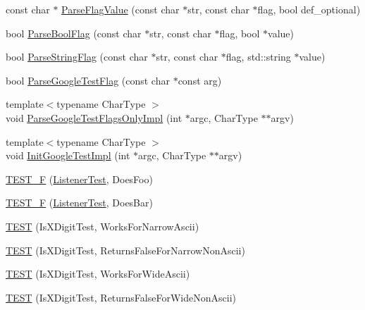 \begin{DoxyCompactItemize}
\item 
const char $\ast$ \hyperlink{namespacetesting_1_1internal_a8bfd56af5e4a89bfb76f7e1723e41b03}{Parse\+Flag\+Value} (const char $\ast$str, const char $\ast$flag, bool def\+\_\+optional)
\item 
bool \hyperlink{namespacetesting_1_1internal_ada3b98e7cfe93f4ba2053c470d9e3e51}{Parse\+Bool\+Flag} (const char $\ast$str, const char $\ast$flag, bool $\ast$value)
\item 
bool \hyperlink{namespacetesting_1_1internal_aa4ce312efaaf7a97aac2303173afe021}{Parse\+String\+Flag} (const char $\ast$str, const char $\ast$flag, std\+::string $\ast$value)
\item 
bool \hyperlink{namespacetesting_1_1internal_afccff08aa2b1ede0dd32c1364a5dee42}{Parse\+Google\+Test\+Flag} (const char $\ast$const arg)
\item 
{\footnotesize template$<$typename Char\+Type $>$ }\\void \hyperlink{namespacetesting_1_1internal_ae4c46ce8c3d016848fff52cc5133f2ac}{Parse\+Google\+Test\+Flags\+Only\+Impl} (int $\ast$argc, Char\+Type $\ast$$\ast$argv)
\item 
{\footnotesize template$<$typename Char\+Type $>$ }\\void \hyperlink{namespacetesting_1_1internal_ac3c6fa93391768aa91c6238b31aaeeb5}{Init\+Google\+Test\+Impl} (int $\ast$argc, Char\+Type $\ast$$\ast$argv)
\item 
\hyperlink{namespacetesting_1_1internal_a7e113e9c70d45d89fe1703e58ff083b9}{T\+E\+S\+T\+\_\+F} (\hyperlink{classtesting_1_1internal_1_1_listener_test}{Listener\+Test}, Does\+Foo)
\item 
\hyperlink{namespacetesting_1_1internal_a02cef32090020d164460dd3d9f8e2852}{T\+E\+S\+T\+\_\+F} (\hyperlink{classtesting_1_1internal_1_1_listener_test}{Listener\+Test}, Does\+Bar)
\item 
\hyperlink{namespacetesting_1_1internal_a0c1e055c001e4dbb874f00a46c25bb00}{T\+E\+ST} (Is\+X\+Digit\+Test, Works\+For\+Narrow\+Ascii)
\item 
\hyperlink{namespacetesting_1_1internal_a7cd9d67d4164d2aeb4ceb3ed253c7d2d}{T\+E\+ST} (Is\+X\+Digit\+Test, Returns\+False\+For\+Narrow\+Non\+Ascii)
\item 
\hyperlink{namespacetesting_1_1internal_af76bca685fddffc0ecda1464b1b6a0a4}{T\+E\+ST} (Is\+X\+Digit\+Test, Works\+For\+Wide\+Ascii)
\item 
\hyperlink{namespacetesting_1_1internal_a771232ed3801fa49cbd4bbe11b318fe3}{T\+E\+ST} (Is\+X\+Digit\+Test, Returns\+False\+For\+Wide\+Non\+Ascii)

\end{DoxyCompactItemize}
